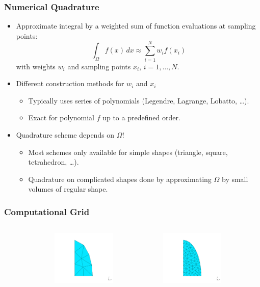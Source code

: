 \documentclass[ignorenonframetext,11pt]{beamer}
\theoremstyle{definition}
\newcommand{\diffd}{\,d}
\begin{document}
\begin{frame}
  \frametitle{Numerical Quadrature}
  \begin{itemize}
  \item Approximate integral by a weighted sum of function evaluations at sampling points:
  \begin{equation*}
    \int_\Omega f(x) \diffd x \approx \sum_{i = 1}^N w_i f(x_i)
  \end{equation*}
  with weights $w_i$ and sampling points $x_i$, $i = 1,\dots,N$.\\[1em]
\item Different construction methods for $w_i$ and $x_i$
  \begin{itemize}
  \item Typically uses series of polynomials (Legendre, Lagrange, Lobatto, \dots).
  \item Exact for polynomial $f$ up to a predefined order.
  \end{itemize}
\item Quadrature scheme depends on $\Omega$!
  \begin{itemize}
  \item Most schemes only available for simple shapes (triangle, square, tetrahedron, \dots).
  \item Quadrature on complicated shapes done by approximating $\Omega$ by small volumes of regular shape.
  \end{itemize}
  \end{itemize}
\end{frame}


\begin{frame}
  \frametitle{Computational Grid}
  \begin{columns}
    \begin{column}{0.3\textwidth}
    \end{column}
    \begin{column}{0.3\textwidth}
      \includegraphics[width=3cm]{ellipsemeshcoarse-cropped}
    \end{column}
    \begin{column}{0.3\textwidth}
      \includegraphics[width=3cm]{ellipsemesh-cropped}
    \end{column}
  \end{columns}
\end{frame}
\end{document}
